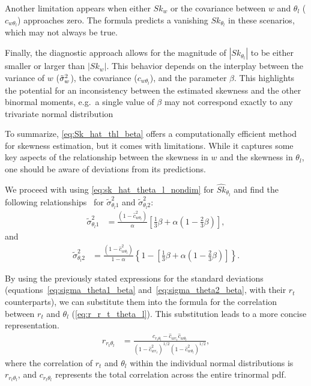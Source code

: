 Another limitation appears when either $Sk_w$
or the covariance between $w$ and $\theta_l$ ($c_{w \theta_l}$) approaches zero.
The formula predicts a vanishing $Sk_{\theta_l}$ in these scenarios,
which may not always be true.

Finally, the diagnostic approach allows for the magnitude of $\left| Sk_{\theta_l} \right|$
to be either smaller or larger than $\left| Sk_w \right|$.
This behavior depends on the interplay between the variance of $w$ (${\tilde{\sigma}_w}^2$),
the covariance ($c_{w \theta_l}$),
and the parameter $\beta$.
This highlights the potential for an inconsistency between the estimated skewness and the other binormal moments,
e.g.\ a single value of $\beta$ may not correspond exactly to any trivariate normal distribution

To summarize, \cref{eq:Sk_hat_thl_beta} offers a computationally efficient method for skewness estimation,
but it comes with limitations.
While it captures some key aspects of the relationship between the skewness in $w$
and the skewness in $\theta_l$,
one should be aware of deviations from its predictions.

We proceed with using \cref{eq:sk_hat_theta_l_nondim} for $\widehat{Sk}_{\theta_l}$
and find the following relationships~\autocite{larson2005using}
for $\tilde{\sigma}_{\theta_l 1}^2$ and $\tilde{\sigma}_{\theta_l 2}^2$:
\begin{align}
    \label{eq:sigma_theta1_beta}
    \tilde{\sigma}_{\theta_l 1}^2
    &= \frac{\left(1 - \widehat{c}_{w \theta_l}^2\right)}{\alpha} \left[\frac{1}{3} \beta + \alpha \left(1 - \frac{2}{3} \beta\right)\right],
\end{align}
and
\begin{align}
    \label{eq:sigma_theta2_beta}
    \tilde{\sigma}_{\theta_l 2}^2
    &= \frac{\left(1 - \widehat{c}_{w \theta_l}^2\right)} {1 - \alpha} \left\{1 - \left[\frac{1}{3}\beta + \alpha \left(1 - \frac{2}{3} \beta \right)\right]\right\}.
\end{align}

By using the previously stated expressions for the standard deviations
(equations~\eqref{eq:sigma_theta1_beta} and~\eqref{eq:sigma_theta2_beta},
with their $r_t$ counterparts),
we can substitute them into the formula for the correlation between
$r_t$ and $\theta_l$ (\cref{eq:r_r_t_theta_l}).
This substitution leads to a more concise representation.
\begin{align}
    \label{eq:r_r_t_theta_l_beta}
    r_{r_t \theta_l}
    &= \frac{c_{r_t \theta_l} - \widehat{c}_{w r_t} \widehat{c}_{w \theta_l}}
    {\left(1 - \widehat{c}_{w r_t}^2\right)^{1/2} \left(1 - \widehat{c}_{w \theta_l}^2\right)^{1/2}},
\end{align}
where the correlation of $r_t$ and $\theta_l$ within the individual normal distributions is $r_{r_t \theta_l}$,
and $c_{r_t \theta_l}$ represents the total correlation across the entire trinormal \gls{pdf}.